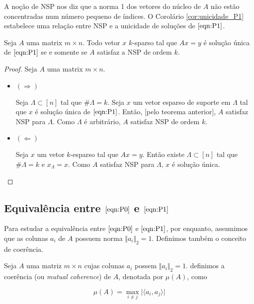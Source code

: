 A noção de NSP nos diz que a norma 1 dos vetores do núcleo de $A$ não estão concentradas num número pequeno de índices. O Corolário \ref{cor:unicidade_P1} estabelece uma relação entre NSP e a unicidade de soluções de $\eqref{eqn:P1}$.

\begin{corolario}
\label{cor:unicidade_P1}
Seja $A$ uma matrix $m \times n$. Todo vetor $x$ $k$-sparso tal que $Ax = y$ é solução única de $\eqref{eqn:P1}$ se e somente se $A$ satisfaz a NSP de ordem $k$.
\end{corolario}
\begin{proof}
Seja $A$ uma matrix $m \times n$.
\begin{itemize}

\item $( \Rightarrow )$

Seja $\Lambda \subset [n]$ tal que $\# \Lambda = k$. Seja $x$ um vetor esparso de suporte em $\Lambda$ tal que $x$ é solução única de $\eqref{eqn:P1}$. Então, [pelo teorema anterior], $A$ satisfaz NSP para $\Lambda$. Como $\Lambda$ é arbitrário, $A$ satisfaz NSP de ordem $k$.

\item $( \Leftarrow )$

Seja $x$ um vetor $k$-esparso tal que $Ax = y$. Então existe $\Lambda \subset [n]$ tal que $\# \Lambda = k$ e $x_{\Lambda} = x$. Como $A$ satisfaz NSP para $\Lambda$, $x$ é solução única.
\end{itemize}
\end{proof}

\subsection{Equivalência entre $\eqref{eqn:P0}$ e $\eqref{eqn:P1}$}
Para estudar a equivalência entre $\eqref{eqn:P0}$ e $\eqref{eqn:P1}$, por enquanto, assumimos que as colunas $a_i$ de $A$ possuem norma $\Vert a_i \Vert_2 = 1$. Definimos também o conceito de coerência.

\begin{definicao}
Seja $A$ uma matriz $m \times n$ cujas colunas $a_i$ possem $\Vert a_i \Vert_2 = 1$. definimos a coerência (ou \textit{mutual coherence}) de $A$, denotada por $\mu(A)$, como


$$\mu(A) = \max_{i \neq j} \vert \langle a_i, a_j \rangle \vert$$
\end{definicao}

